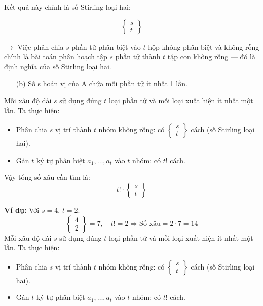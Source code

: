 \documentclass{article}
\begin{document}
	Kết quả này chính là số Stirling loại hai:
	
	\[
	\left\{ \begin{matrix}
		s \\
		t
	\end{matrix} \right\}
	\]
	
	$\rightarrow$
	Việc phân chia $s$ phần tử phân biệt vào $t$ hộp không phân biệt và không rỗng chính là bài toán phân hoạch tập $s$ phần tử thành $t$ tập con không rỗng — đó là định nghĩa của số Stirling loại hai.
	
	\begin{enumerate}
		\item[(b)] Số s hoán vị của A chứa mỗi phần tử ít nhất 1 lần.
	\end{enumerate}
	
	Mỗi xâu độ dài $s$ sử dụng đúng $t$ loại phần tử và mỗi loại xuất hiện ít nhất một lần. Ta thực hiện:
	
	\begin{itemize}
		\item Phân chia $s$ vị trí thành $t$ nhóm không rỗng: có $\left\{ \begin{matrix} s \\ t \end{matrix} \right\}$ cách (số Stirling loại hai).
		\item Gán $t$ ký tự phân biệt $a_1, \dots, a_t$ vào $t$ nhóm: có $t!$ cách.
	\end{itemize}
	
	Vậy tổng số xâu cần tìm là:
	\[
	\boxed{
		t! \cdot \left\{ \begin{matrix} s \\ t \end{matrix} \right\}
	}
	\]
	
	\textbf{Ví dụ:} Với $s = 4$, $t = 2$:
	\[
	\left\{ \begin{matrix} 4 \\ 2 \end{matrix} \right\} = 7, \quad t! = 2 \Rightarrow \text{Số xâu} = 2 \cdot 7 = 14
	\]
	Mỗi xâu độ dài $s$ sử dụng đúng $t$ loại phần tử và mỗi loại xuất hiện ít nhất một lần. Ta thực hiện:
	
	\begin{itemize}
		\item Phân chia $s$ vị trí thành $t$ nhóm không rỗng: có $\left\{ \begin{matrix} s \\ t \end{matrix} \right\}$ cách (số Stirling loại hai).
		\item Gán $t$ ký tự phân biệt $a_1, \dots, a_t$ vào $t$ nhóm: có $t!$ cách.
	\end{itemize}
	
\end{document}

